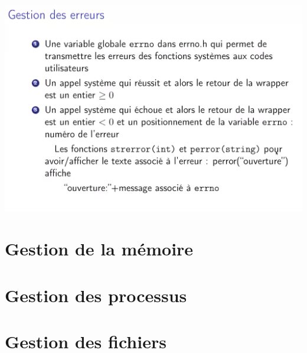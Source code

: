 \documentclass{article}
\begin{document}
    \includegraphics{15.PNG}
    \section{Gestion de la mémoire}
    \section{Gestion des processus}
    \section{Gestion des fichiers}
    
\end{document}
